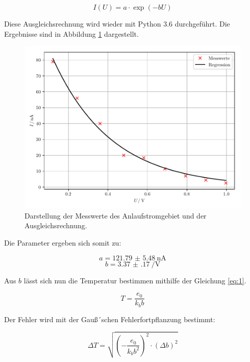 \begin{equation*}
  I(U) = a \cdot \exp(-b U)
\end{equation*}

Diese Ausgleichsrechnung wird wieder mit Python 3.6 durchgeführt. Die Ergebnisse sind
in Abbildung \ref{abb:8} dargestellt.

\begin{figure}[H]
  \centering
  \includegraphics{plot3.pdf}
  \caption{Darstellung der Messwerte des Anlaufstromgebiet und der Ausgleichsrechnung.}
  \label{abb:8}
\end{figure}

Die Parameter ergeben sich somit zu:

\begin{equation*}
  a = \SI{121.79(548)}{\nano\ampere}
\end{equation*}
\begin{equation*}
  b = \SI{3.37(17)}{\per\volt}
\end{equation*}

Aus $b$ lässt sich nun die Temperatur bestimmen mithilfe der Gleichung \ref{eq:1}.

\begin{equation*}
  T = \frac{e_0}{k_b b}
\end{equation*}

Der Fehler wird mit der Gauß´schen Fehlerfortpflanzung bestimmt:

\begin{equation*}
  \Delta T = \sqrt{\left(-\frac{e_0}{k_b b^2}\right)^2 \cdot (\Delta b)^2}
\end{equation*}

